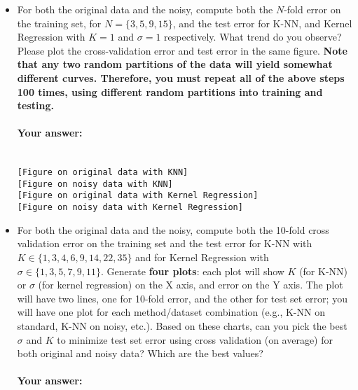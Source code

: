 \begin{itemize}
\item For both the original data and the noisy, compute both the
  $N$-fold error on the training set, for $N = \{3, 5, 9, 15\}$, and the test error for K-NN, and Kernel Regression with $K = 1$ and $\sigma = 1$ respectively.  What trend do you observe? Please plot the cross-validation error and test error in the same figure.
 {\bf Note that any two random partitions of the data will yield somewhat different curves. Therefore, you must repeat all of the above steps 100 times, using different random partitions into training and testing.}

 \paragraph{Your answer:}
 ~\\
 
 {\tt  [Figure on original data with KNN]}
 \\    
 
 {\tt [Figure on noisy data with KNN]}
 \\

  {\tt  [Figure on original data with Kernel Regression]}
 \\    
 
  {\tt  [Figure on noisy data with Kernel Regression]}
 \\    

\item For both the original data and the noisy, compute both the
  10-fold cross validation error on the training set and the test error for K-NN with
  $K \in \{1, 3, 4, 6, 9, 14, 22, 35\}$ and for Kernel Regression with $\sigma \in \{1, 3, 5, 7, 9, 11\}$.  Generate {\bf
    four plots}: each plot will show $K$ (for K-NN) or $\sigma$ (for
  kernel regression) on the X axis, and error on the Y axis. The plot
  will have two lines, one for 10-fold error, and the
  other for test set error; you will have one plot for each
  method/dataset combination (e.g., K-NN on standard, K-NN on noisy,
  etc.). Based on these charts, can you pick the best $\sigma$ and $K$
  to minimize test set error using cross validation (on average) for both original and noisy data? Which are the best values? 
  
  \paragraph{Your answer:}
 ~\\
 

\end{itemize}
